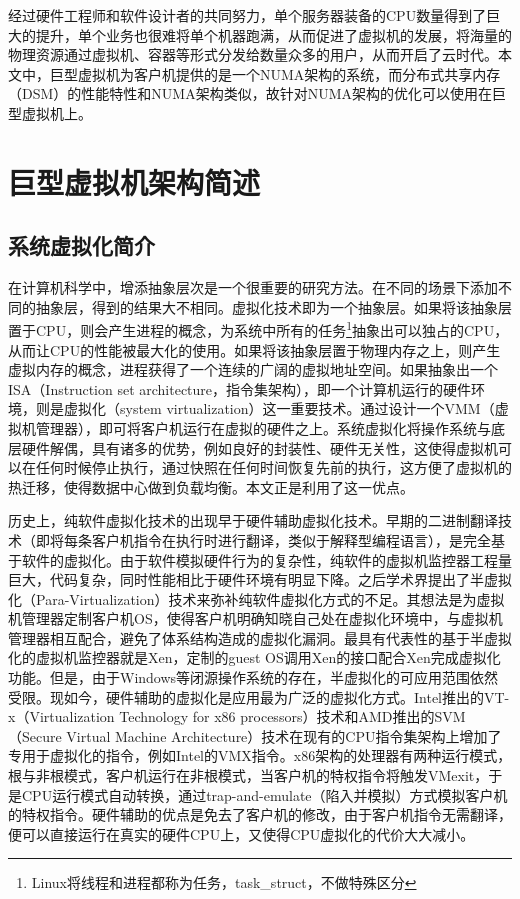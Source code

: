 经过硬件工程师和软件设计者的共同努力，单个服务器装备的CPU数量得到了巨大的提升，单个业务也很难将单个机器跑满，从而促进了虚拟机的发展，将海量的物理资源通过虚拟机、容器等形式分发给数量众多的用户，从而开启了云时代。本文中，巨型虚拟机为客户机提供的是一个NUMA架构的系统，而分布式共享内存（DSM）的性能特性和NUMA架构类似，故针对NUMA架构的优化可以使用在巨型虚拟机上。
\section{巨型虚拟机架构简述}
\subsection{系统虚拟化简介}
在计算机科学中，增添抽象层次是一个很重要的研究方法。在不同的场景下添加不同的抽象层，得到的结果大不相同。虚拟化技术即为一个抽象层。如果将该抽象层置于CPU，则会产生进程的概念，为系统中所有的任务\footnote{Linux将线程和进程都称为任务，task\_struct，不做特殊区分}抽象出可以独占的CPU，从而让CPU的性能被最大化的使用。如果将该抽象层置于物理内存之上，则产生虚拟内存的概念，进程获得了一个连续的广阔的虚拟地址空间。如果抽象出一个ISA（Instruction set architecture，指令集架构），即一个计算机运行的硬件环境，则是虚拟化（system virtualization）这一重要技术。通过设计一个VMM（虚拟机管理器），即可将客户机运行在虚拟的硬件之上。系统虚拟化将操作系统与底层硬件解偶，具有诸多的优势，例如良好的封装性、硬件无关性\cite{sysv}，这使得虚拟机可以在任何时候停止执行，通过快照在任何时间恢复先前的执行，这方便了虚拟机的热迁移，使得数据中心做到负载均衡。本文正是利用了这一优点。

历史上，纯软件虚拟化技术的出现早于硬件辅助虚拟化技术。早期的二进制翻译技术（即将每条客户机指令在执行时进行翻译，类似于解释型编程语言），是完全基于软件的虚拟化。由于软件模拟硬件行为的复杂性，纯软件的虚拟机监控器工程量巨大，代码复杂，同时性能相比于硬件环境有明显下降。之后学术界提出了半虚拟化（Para-Virtualization）技术来弥补纯软件虚拟化方式的不足。其想法是为虚拟机管理器定制客户机OS，使得客户机明确知晓自己处在虚拟化环境中，与虚拟机管理器相互配合，避免了体系结构造成的虚拟化漏洞。最具有代表性的基于半虚拟化的虚拟机监控器就是Xen\cite{artofxen}，定制的guest OS调用Xen的接口配合Xen完成虚拟化功能。但是，由于Windows等闭源操作系统的存在，半虚拟化的可应用范围依然受限。现如今，硬件辅助的虚拟化是应用最为广泛的虚拟化方式。Intel推出的VT-x（Virtualization Technology for x86 processors）技术\cite{intelv}和AMD推出的SVM（Secure Virtual Machine Architecture）技术\cite{amdv}在现有的CPU指令集架构上增加了专用于虚拟化的指令，例如Intel的VMX指令\cite{intelSDM}。x86架构的处理器有两种运行模式，根与非根模式，客户机运行在非根模式，当客户机的特权指令将触发VMexit，于是CPU运行模式自动转换，通过trap-and-emulate（陷入并模拟）方式模拟客户机的特权指令。硬件辅助的优点是免去了客户机的修改，由于客户机指令无需翻译，便可以直接运行在真实的硬件CPU上，又使得CPU虚拟化的代价大大减小。

